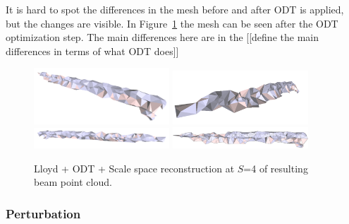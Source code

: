 \documentclass[12pt]{drexelthesis}
\let\Oldsubsubsection\subsubsection
\renewcommand{\subsubsection}{\FloatBarrier\Oldsubsubsection}
\begin{document}
It is hard to spot the differences in the mesh before and after ODT is applied, but the changes are visible. In Figure~\ref{lidar:scalespace4lloydodt} the mesh can be seen after the ODT optimization step. The main differences here are in the [[define the main differences in terms of what ODT does]]

\begin{figure}[!ht]
	\centering
		\includegraphics[width=2in]{real-lab-scans/meshed/optimized/scalespace4lloydodt00.png}
		\includegraphics[width=2in]{real-lab-scans/meshed/optimized/scalespace4lloydodt01.png}
		\includegraphics[width=2in]{real-lab-scans/meshed/optimized/scalespace4lloydodt02.png}
		\includegraphics[width=2in]{real-lab-scans/meshed/optimized/scalespace4lloydodt03.png}
		\caption[Lloyd + ODT + Scale space reconstruction at $S$=4 of segmented LiDAR data]{\centering Lloyd + ODT + Scale space reconstruction at $S$=4 of resulting beam point cloud.}
	\label{lidar:scalespace4lloydodt}
\end{figure}

\subsubsection{Perturbation}
\end{document}
